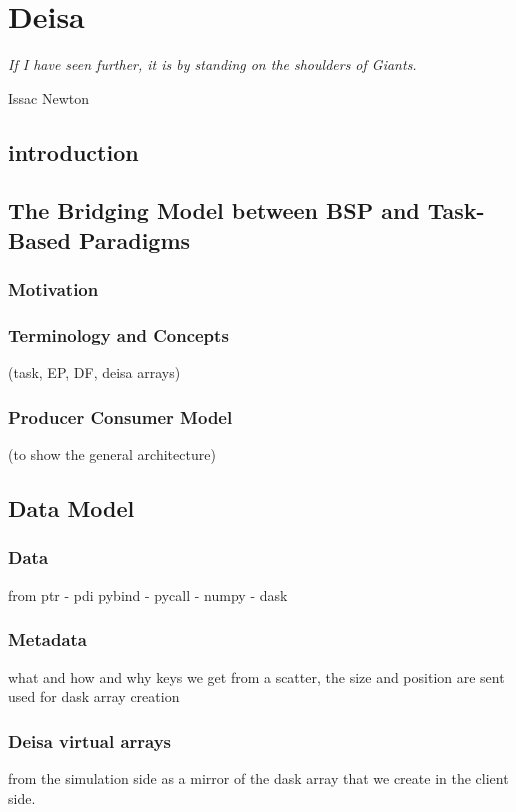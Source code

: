 \chapter{Deisa}



\epigraph{\textit{If I have seen further, it is by standing on the shoulders of Giants.}} {Issac Newton}



\section{introduction}

\section{The Bridging Model between BSP and Task-Based Paradigms}

\subsection{Motivation}

\subsection{Terminology and Concepts}
 (task, EP, DF, deisa arrays)

 
\subsection{Producer Consumer Model}
 (to show the general architecture)



\section{Data Model}
\subsection{Data}
from ptr - pdi pybind -  pycall - numpy - dask

\subsection{Metadata}
what and how and why 
keys we get from a scatter, the size and position are sent 
used for dask array creation 
\subsection{Deisa virtual arrays}
from the simulation side as a mirror of the dask array that we create in the client side.

